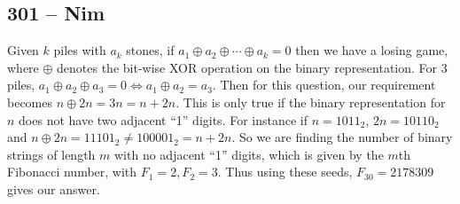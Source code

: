 \documentclass{article}
\begin{document}
\subsection*{301 -- Nim} 
Given $k$ piles with $a_k$ stones, if $a_1 \oplus a_2 \oplus \dotsb \oplus a_k = 0$ then we have a losing game, where $\oplus$ denotes the bit-wise XOR operation on the binary representation. 
For 3 piles, $a_1 \oplus a_2 \oplus a_3 = 0 \iff a_1 \oplus a_2 = a_3$. 
Then for this question, our requirement becomes $n \oplus 2n = 3n = n + 2n$. 
This is only true if the binary representation for $n$ does not have two adjacent ``1'' digits. 
For instance if $n = 1011_2$, $2n = 10110_2$ and $n \oplus 2n = 11101_2 \neq 100001_2 = n+2n$. 
So we are finding the number of binary strings of length $m$ with no adjacent ``1'' digits, which is given by the $m$th Fibonacci number, with $F_1 = 2, F_2 = 3$. 
Thus using these seeds, $F_{30} = \boxed{2178309}$ gives our answer.
\end{document}
